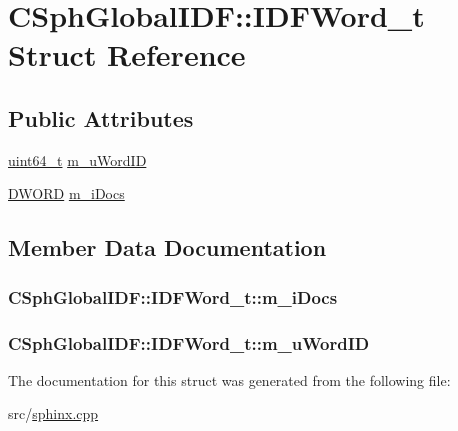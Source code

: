 \hypertarget{structCSphGlobalIDF_1_1IDFWord__t}{\section{C\-Sph\-Global\-I\-D\-F\-:\-:I\-D\-F\-Word\-\_\-t Struct Reference}
\label{structCSphGlobalIDF_1_1IDFWord__t}
}
\subsection*{Public Attributes}
\begin{DoxyCompactItemize}
\item 
\hyperlink{sphinxstd_8h_aaa5d1cd013383c889537491c3cfd9aad}{uint64\-\_\-t} \hyperlink{structCSphGlobalIDF_1_1IDFWord__t_ae4849911979bcfe45c487683c13fda82}{m\-\_\-u\-Word\-I\-D}
\item 
\hyperlink{sphinxstd_8h_a798af1e30bc65f319c1a246cecf59e39}{D\-W\-O\-R\-D} \hyperlink{structCSphGlobalIDF_1_1IDFWord__t_a095f1ca0a49bf2e5d42bb947837f58aa}{m\-\_\-i\-Docs}
\end{DoxyCompactItemize}


\subsection{Member Data Documentation}
\hypertarget{structCSphGlobalIDF_1_1IDFWord__t_a095f1ca0a49bf2e5d42bb947837f58aa}{
\subsubsection[{m\-\_\-i\-Docs}]{ C\-Sph\-Global\-I\-D\-F\-::\-I\-D\-F\-Word\-\_\-t\-::m\-\_\-i\-Docs}}\label{structCSphGlobalIDF_1_1IDFWord__t_a095f1ca0a49bf2e5d42bb947837f58aa}
\hypertarget{structCSphGlobalIDF_1_1IDFWord__t_ae4849911979bcfe45c487683c13fda82}{
\subsubsection[{m\-\_\-u\-Word\-I\-D}]{ C\-Sph\-Global\-I\-D\-F\-::\-I\-D\-F\-Word\-\_\-t\-::m\-\_\-u\-Word\-I\-D}}\label{structCSphGlobalIDF_1_1IDFWord__t_ae4849911979bcfe45c487683c13fda82}


The documentation for this struct was generated from the following file\-:\begin{DoxyCompactItemize}
\item 
src/\hyperlink{sphinx_8cpp}{sphinx.\-cpp}\end{DoxyCompactItemize}
